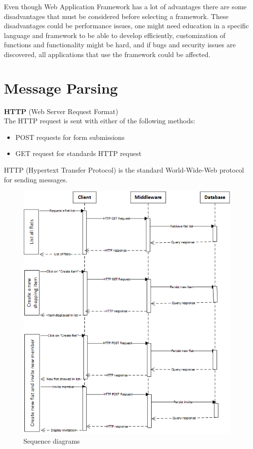 \documentclass{sig-alt-release2}
\begin{document}
Even though Web Application Framework has a lot of advantages there are some
disadvantages that must be considered before selecting a framework. These
disadvantages could be performance issues, one might need education in a
specific language and framework to be able to develop efficiently, customization
of functions and functionality might be hard, and if bugs and security issues
are discovered, all applications that use the framework could be affected.
\cite{x11}

\section{Message Parsing}

\noindent
\textbf{HTTP} (Web Server Request Format) \\
The HTTP request is sent with either of the following methods:
\begin{itemize}
\item POST requests for form submissions
\item GET request for standards HTTP request
\end{itemize}

HTTP (Hypertext Transfer Protocol) is the standard World-Wide-Web protocol for
sending messages.

\begin{figure}[!ht]
\centering
\includegraphics[scale=0.55]{sequencediagrams}
\caption{Sequence diagrams}
\label{fig:sequence}
\end{figure}
\end{document}
